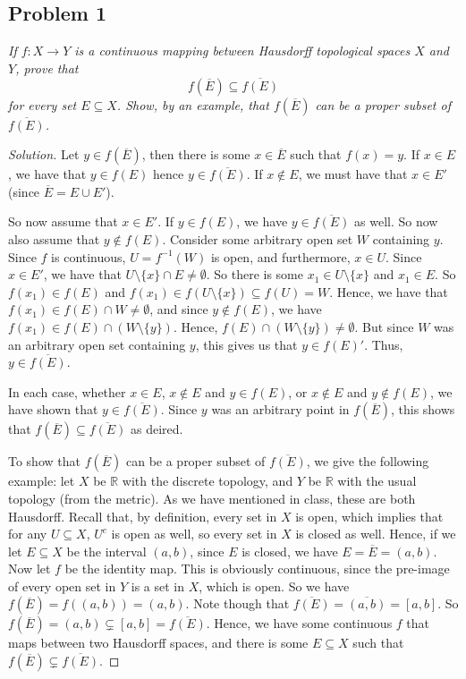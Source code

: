 \documentclass{article}
\newcommand{\R}{{\mathbb R}}
\begin{document}
\subsection*{Problem 1}
{\it If $f \colon X \to Y$ is a continuous mapping between
Hausdorff topological spaces $X$ and $Y$,
prove that
\[
	f(\overline{E}) \subseteq \overline{f(E)}
\]
for every set $E \subseteq X$.
Show, by an example, that $f(\overline{E})$ can be a proper subset of $\overline{f(E)}$.}

\begin{proof}[Solution]\let\qed\relax
	Let $y \in f(\overline{E})$,
	then there is some $x \in \overline{E}$ such that $f(x) = y$.
	If $x \in E$, we have that $y \in f(E)$ hence $y \in \overline{f(E)}$.
	If $x \not\in E$, we must have that $x \in E'$ (since $\overline{E} = E \cup E'$).
	
	So now assume that $x \in E'$.
	If $y \in f(E)$, we have $y \in \overline{f(E)}$ as well.
	So now also assume that $y \not\in f(E)$.
	Consider some arbitrary open set $W$ containing $y$.
	Since $f$ is continuous, $U = f^{-1}(W)$ is open,
	and furthermore, $x \in U$.
	Since $x \in E'$, we have that $U \setminus\{x\} \cap E \neq \emptyset$.
	So there is some $x_1 \in U\setminus\{x\}$ and $x_1 \in E$.
	So $f(x_1) \in f(E)$ and
	$f(x_1) \in f(U \setminus \{x\}) \subseteq f(U) = W$.
	Hence, we have that $f(x_1) \in f(E) \cap W \neq \emptyset$,
	and since $y \not\in f(E)$, we have $f(x_1) \in f(E) \cap (W \setminus \{y\})$.
	Hence, $f(E) \cap (W \setminus \{y\}) \neq \emptyset$.
	But since $W$ was an arbitrary open set containing $y$,
	this gives us that $y \in f(E)'$.
	Thus, $y \in \overline{f(E)}$.

	In each case, whether $x \in E$,
	$x \not\in E$ and $y \in f(E)$,
	or $x \not\in E$ and $y \not \in f(E)$,
	we have shown that $y \in \overline{f(E)}$.
	Since $y$ was an arbitrary point in $f(\overline{E})$,
	this shows that $f(\overline{E}) \subseteq \overline{f(E)}$ as deired.

	To show that $f(\overline{E})$ can be a proper subset of $\overline{f(E)}$,
	we give the following example:
	let $X$ be $\R$ with the discrete topology,
	and $Y$ be $\R$ with the usual topology (from the metric).
	As we have mentioned in class, these are both Hausdorff.
	Recall that, by definition, every set in $X$ is open,
	which implies that for any $U \subseteq X$, $U^c$ is open as well,
	so every set in $X$ is closed as well.
	Hence, if we let $E \subseteq X$ be the interval $(a,b)$,
	since $E$ is closed, we have $E = \overline{E} = (a,b)$.
	Now let $f$ be the identity map.
	This is obviously continuous, since the pre-image of every
	open set in $Y$ is a set in $X$, which is open.
	So we have $f(\overline{E}) = f((a,b)) = (a,b)$.
	Note though that $\overline{f(E)} = \overline{(a,b)} = [a,b]$.
	So $f(\overline{E}) = (a,b) \subsetneq [a,b] = \overline{f(E)}$.
	Hence, we have some continuous $f$ that maps
	between two Hausdorff spaces,
	and there is some $E \subseteq X$ such that $f(\overline{E}) \subsetneq \overline{f(E)}$.
\end{proof}
\clearpage
~\clearpage
\end{document}
